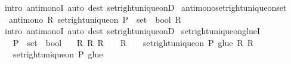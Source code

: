 \begin{isabellebody}
\ {\isacharparenleft}{\kern0pt}intro\ antimonoI{\isacharparenright}{\kern0pt}\ {\isacharparenleft}{\kern0pt}auto\ dest{\isacharcolon}{\kern0pt}\ set{\isacharunderscore}{\kern0pt}right{\isacharunderscore}{\kern0pt}unique{\isacharunderscore}{\kern0pt}onD{\isacharparenright}{\kern0pt}%
\endisatagproof
{\isafoldproof}%
%
\isadelimproof
\isanewline
%
\endisadelimproof
\isanewline
{}\isamarkupfalse%
\ antimono{\isacharunderscore}{\kern0pt}set{\isacharunderscore}{\kern0pt}right{\isacharunderscore}{\kern0pt}unique{\isacharunderscore}{\kern0pt}on{\isacharunderscore}{\kern0pt}set{\isacharcolon}{\kern0pt}\isanewline
\ \ {\isachardoublequoteopen}antimono\ {\isacharparenleft}{\kern0pt}{\isasymlambda}R{\isachardot}{\kern0pt}\ set{\isacharunderscore}{\kern0pt}right{\isacharunderscore}{\kern0pt}unique{\isacharunderscore}{\kern0pt}on\ {\isacharparenleft}{\kern0pt}P\ {\isacharcolon}{\kern0pt}{\isacharcolon}{\kern0pt}\ set\ {\isasymRightarrow}\ bool{\isacharparenright}{\kern0pt}\ R{\isacharparenright}{\kern0pt}{\isachardoublequoteclose}\isanewline
%
\isadelimproof
\ \ %
\endisadelimproof
%
\isatagproof
{}\isamarkupfalse%
\ {\isacharparenleft}{\kern0pt}intro\ antimonoI{\isacharparenright}{\kern0pt}\ {\isacharparenleft}{\kern0pt}auto\ dest{\isacharcolon}{\kern0pt}\ set{\isacharunderscore}{\kern0pt}right{\isacharunderscore}{\kern0pt}unique{\isacharunderscore}{\kern0pt}onD{\isacharparenright}{\kern0pt}%
\endisatagproof
{\isafoldproof}%
%
\isadelimproof
\isanewline
%
\endisadelimproof
\isanewline
{}\isamarkupfalse%
\ set{\isacharunderscore}{\kern0pt}right{\isacharunderscore}{\kern0pt}unique{\isacharunderscore}{\kern0pt}on{\isacharunderscore}{\kern0pt}glueI{\isacharcolon}{\kern0pt}\isanewline
\ \ \ P\ {\isacharcolon}{\kern0pt}{\isacharcolon}{\kern0pt}\ {\isachardoublequoteopen}set\ {\isasymRightarrow}\ bool{\isachardoublequoteclose}\isanewline
\ \ \ {\isachardoublequoteopen}{\isasymAnd}R\ R{\isacharprime}{\kern0pt}{\isachardot}{\kern0pt}\ R\ {\isasymin}\ {\isasymR}\ {\isasymLongrightarrow}\ R{\isacharprime}{\kern0pt}\ {\isasymin}\ {\isasymR}\ {\isasymLongrightarrow}\ set{\isacharunderscore}{\kern0pt}right{\isacharunderscore}{\kern0pt}unique{\isacharunderscore}{\kern0pt}on\ P\ {\isacharparenleft}{\kern0pt}glue\ {\isacharbraceleft}{\kern0pt}R{\isacharcomma}{\kern0pt}\ R{\isacharprime}{\kern0pt}{\isacharbraceright}{\kern0pt}{\isacharparenright}{\kern0pt}{\isachardoublequoteclose}\isanewline
\ \ \ {\isachardoublequoteopen}set{\isacharunderscore}{\kern0pt}right{\isacharunderscore}{\kern0pt}unique{\isacharunderscore}{\kern0pt}on\ P\ {\isacharparenleft}{\kern0pt}glue\ {\isasymR}{\isacharparenright}{\kern0pt}{\isachardoublequoteclose}\isanewline

\end{isabellebody}
